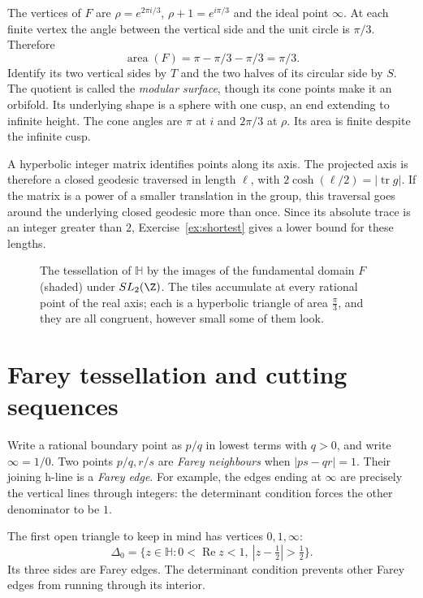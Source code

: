 The vertices of $F$ are $\rho=e^{2\pi i/3}$, $\rho+1=e^{i\pi/3}$ and the ideal point $\infty$. At each finite vertex the angle between the vertical side and the unit circle is $\pi/3$. Therefore
\[
\operatorname{area}(F)=\pi-\pi/3-\pi/3=\pi/3.
\]
Identify its two vertical sides by $T$ and the two halves of its circular side by $S$. The quotient is called the \emph{modular surface}, though its cone points make it an orbifold. Its underlying shape is a sphere with one cusp, an end extending to infinite height. The cone angles are $\pi$ at $i$ and $2\pi/3$ at $\rho$. Its area is finite despite the infinite cusp.

A hyperbolic integer matrix identifies points along its axis. The projected axis is therefore a closed geodesic traversed in length $\ell$, with $2\cosh(\ell/2)=|\operatorname{tr}g|$. If the matrix is a power of a smaller translation in the group, this traversal goes around the underlying closed geodesic more than once. Since its absolute trace is an integer greater than $2$, Exercise~\ref{ex:shortest} gives a lower bound for these lengths.

\begin{figure}[ht]
\centering
{}
\caption{The tessellation of $\mathbb H$ by the images of the fundamental domain $F$ (shaded) under $SL_2(\Z)$. The tiles accumulate at every rational point of the real axis; each is a
hyperbolic triangle of area $\frac\pi3$, and they are all congruent, however small some of them look.}
\label{fig:modular}
\end{figure}

\section{Farey tessellation and cutting sequences}

Write a rational boundary point as $p/q$ in lowest terms with $q>0$, and write $\infty=1/0$. Two points $p/q,r/s$ are \emph{Farey neighbours} when $|ps-qr|=1$. Their joining h-line is a \emph{Farey edge}. For example, the edges ending at $\infty$ are precisely the vertical lines through integers: the determinant condition forces the other denominator to be $1$.

The first open triangle to keep in mind has vertices $0,1,\infty$:
\[
\Delta_0=\{z\in\mathbb H:0<\operatorname{Re}z<1,\ |z-\tfrac12|>\tfrac12\}.
\]
Its three sides are Farey edges. The determinant condition prevents other Farey edges from running through its interior.

